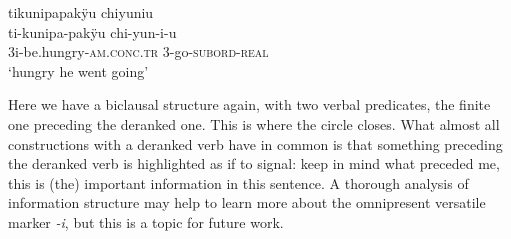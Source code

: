 \ea\label{ex:hungry-go-2}
\begingl
\glpreamble tikunipapakÿu chiyuniu\\
\gla ti-kunipa-pakÿu chi-yun-i-u\\
\glb 3i-be.hungry-\textsc{am.conc.tr} 3-go-\textsc{subord}-\textsc{real}\\
\glft ‘hungry he went going’
\endgl
\trailingcitation{[jmx-n120429ls-x5.222]}
\xe

Here we have a biclausal structure again, with two verbal predicates, the finite one preceding the deranked one. This is where the circle closes. What almost all constructions with a deranked verb have in common is that something preceding the deranked verb is highlighted as if to signal: keep in mind what preceded me, this is (the) important information in this sentence. A thorough analysis of information structure may help to learn more about the omnipresent versatile marker \textit{-i}, but this is a topic for future work.

